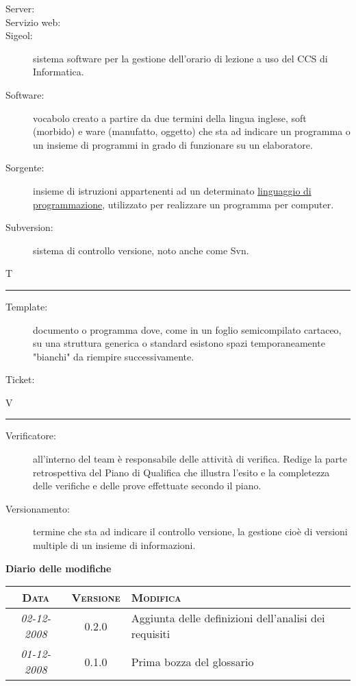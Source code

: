\documentclass[11pt,a4paper]{article}
\newcommand{\modifiche} 
{
\newpage
\begin{center}
\textbf{Diario delle modifiche} \\
\bigskip
\begin{tabular}{|c|c|p{0.55\textwidth}|}
\hline
\textsc{Data} & \textsc{Versione} & \textsc{Modifica} \\
\hline
\hline
\textit{02-12-2008} & 0.2.0 & Aggiunta delle definizioni dell'analisi dei requisiti \\
\hline
\textit{01-12-2008} & 0.1.0 & Prima bozza del glossario \\
\hline
\end{tabular}
\end{center}
}
\begin{document}
\begin{description}
	\item[Server:]
	\item[Servizio web:]
	\item[Sigeol:] sistema software per la gestione dell'orario di lezione a uso del CCS di Informatica.
	\item[Software:] vocabolo creato a partire da due termini della lingua inglese, soft (morbido) e ware (manufatto, oggetto) che sta ad indicare un programma o un insieme di programmi in grado di funzionare su un elaboratore.
	\item[Sorgente:] insieme di istruzioni appartenenti ad un determinato \underline{linguaggio di programmazione}, utilizzato per realizzare un programma per computer.
	\item[Subversion:] sistema di controllo versione, noto anche come Svn.
\end{description}
\bigskip
\Huge T \bigskip
\hrule
\smallskip
\normalsize
\begin{description}
	\item[Template:] documento o programma dove, come in un foglio semicompilato cartaceo, su una struttura generica o standard esistono spazi temporaneamente "bianchi" da riempire successivamente.
	\item[Ticket:]
\end{description}
\bigskip
\Huge V \bigskip
\hrule
\smallskip
\normalsize
\begin{description}
	\item[Verificatore:] all'interno del team è responsabile delle attività di verifica. Redige la parte retrospettiva del Piano di Qualifica che illustra l'esito e la completezza delle verifiche e delle prove effettuate secondo il piano.
	\item[Versionamento:] termine che sta ad indicare il controllo versione, la gestione cioè di versioni multiple di un insieme di informazioni.
\end{description}
\bigskip
\modifiche
\end{document}
